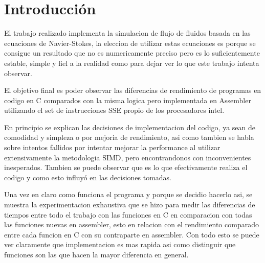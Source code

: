 \section{Introducción}

El trabajo realizado implementa la simulacion de flujo de fluidos basada en las
ecuaciones de Navier-Stokes, la eleccion de utilizar estas ecuaciones es porque
se consigue un resultado que no es numericamente preciso pero es lo
suficientemente estable, simple y fiel a la realidad como para dejar ver lo que
este trabajo intenta observar.



El objetivo final es poder observar las
diferencias de rendimiento de programas en codigo en C comparados con la misma
logica pero implementada en Assembler utilizando el set de instrucciones SSE
propio de los procesadores intel.



En principio se explican las decisiones de implementacion del codigo, ya sean de
comodidad y simpleza o por mejoria de rendimiento, asi como tambien se habla
sobre intentos fallidos por intentar mejorar la performance al utilizar
extensivamente la metodologia SIMD, pero encontrandonos con inconvenientes
inesperados. Tambien se puede observar que es lo que efectivamente realiza el
codigo y como esto influyó en las decisiones tomadas.



Una vez en claro como funciona el programa y porque se decidio hacerlo asi, se
muestra la experimentacion exhaustiva que se hizo para medir las diferencias de
tiempos entre todo el trabajo con las funciones en C en comparacion con todas
las funciones nuevas en assembler, esto en relacion con el rendimiento comparado
entre cada funcion en C con su contraparte en assembler. Con todo esto se puede
ver claramente que implementacion es mas rapida asi como distinguir que
funciones son las que hacen la mayor diferencia en general.
